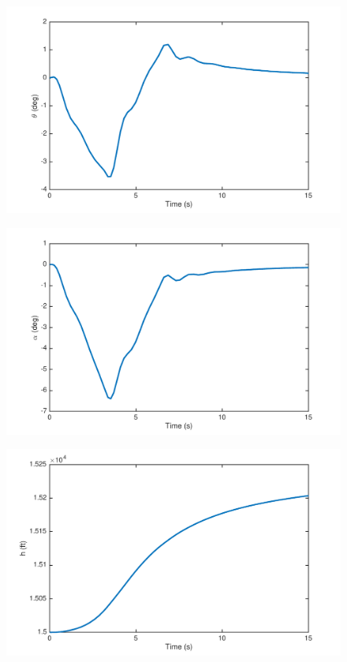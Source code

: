 \documentclass[12pt]{article}
\begin{document}
\begin{figure}[h]
\begin{center}
\includegraphics[width=1\textwidth]{figures/theta}
\end{center}
\end{figure}
\begin{figure}[h]
\begin{center}
\includegraphics[width=1\textwidth]{figures/alpha}
\end{center}
\end{figure}
\begin{figure}[h]
\begin{center}
\includegraphics[width=1\textwidth]{figures/h}
\end{center}
\end{figure}
\end{document}
